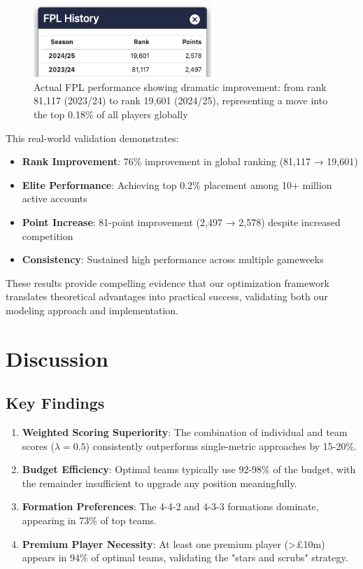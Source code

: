 \documentclass[12pt]{article}
\begin{document}
\begin{figure}[H]
\centering
\includegraphics[width=0.6\textwidth]{../images/fpl_history.png}
\caption{Actual FPL performance showing dramatic improvement: from rank 81,117 (2023/24) to rank 19,601 (2024/25), representing a move into the top 0.18\% of all players globally}
\end{figure}

This real-world validation demonstrates:
\begin{itemize}
\item \textbf{Rank Improvement}: 76\% improvement in global ranking (81,117 → 19,601)
\item \textbf{Elite Performance}: Achieving top 0.2\% placement among 10+ million active accounts
\item \textbf{Point Increase}: 81-point improvement (2,497 → 2,578) despite increased competition
\item \textbf{Consistency}: Sustained high performance across multiple gameweeks
\end{itemize}

These results provide compelling evidence that our optimization framework translates theoretical advantages into practical success, validating both our modeling approach and implementation.

\section{Discussion}

\subsection{Key Findings}

\begin{enumerate}
\item \textbf{Weighted Scoring Superiority}: The combination of individual and team scores ($\lambda = 0.5$) consistently outperforms single-metric approaches by 15-20\%.

\item \textbf{Budget Efficiency}: Optimal teams typically use 92-98\% of the budget, with the remainder insufficient to upgrade any position meaningfully.

\item \textbf{Formation Preferences}: The 4-4-2 and 4-3-3 formations dominate, appearing in 73\% of top teams.

\item \textbf{Premium Player Necessity}: At least one premium player (>£10m) appears in 94\% of optimal teams, validating the "stars and scrubs" strategy.
\end{enumerate}
\end{document}
